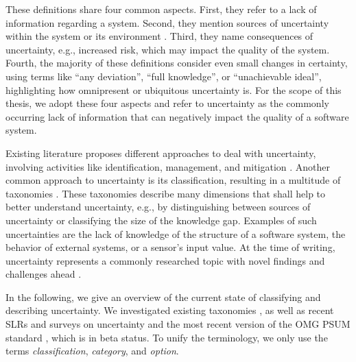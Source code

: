 These definitions share four common aspects.
First, they refer to a lack of information regarding a system.
Second, they mention sources of uncertainty within the system or its environment \cite{acosta_uncertainty_2022}.
Third, they name consequences of uncertainty, e.g., increased risk, which may impact the quality of the system.
Fourth, the majority of these definitions consider even small changes in certainty, using terms like \enquote{any deviation}, \enquote{full knowledge}, or \enquote{unachievable ideal}, highlighting how omnipresent or ubiquitous uncertainty is.
For the scope of this thesis, we adopt these four aspects and refer to uncertainty as the commonly occurring lack of information that can negatively impact the quality of a software system.

Existing literature proposes different approaches to deal with uncertainty, involving activities like identification, management, and mitigation \cite{PSUM,weyns_introduction_2020,perez-palacin_dealing_2014,perez-palacin_uncertainties_2014,sobhy_evaluation_2021,hezavehi_uncertainty_2021}.
Another common approach to uncertainty is its classification, resulting in a multitude of taxonomies \cite{bures_capturing_2020,esfahani_uncertainty_2013,mahdavi-hezavehi_classification_2017,perez-palacin_uncertainties_2014,ramirez_taxonomy_2012,walker_defining_2003,armour_five_2000,troya_uncertainty_2021,hezavehi_uncertainty_2021,PSUM}.
These taxonomies describe many dimensions that shall help to better understand uncertainty, e.g., by distinguishing between sources of uncertainty or classifying the size of the knowledge gap.
Examples of such uncertainties are the lack of knowledge of the structure of a software system, the behavior of external systems, or a sensor's input value.
At the time of writing, uncertainty represents a commonly researched topic with novel findings and challenges ahead \cite{weyns_towards_2023}.

In the following, we give an overview of the current state of classifying and describing uncertainty.
We investigated existing taxonomies \cite{bures_capturing_2020,esfahani_uncertainty_2013,mahdavi-hezavehi_classification_2017,perez-palacin_uncertainties_2014,ramirez_taxonomy_2012,walker_defining_2003,armour_five_2000}, as well as recent \acfp{SLR} and surveys on uncertainty \cite{troya_uncertainty_2021,hezavehi_uncertainty_2021} and the most recent version of the \ac{OMG} \ac{PSUM} standard \cite{PSUM}, which is in beta status.
To unify the terminology, we only use the terms \emph{classification}, \emph{category}, and \emph{option}.



